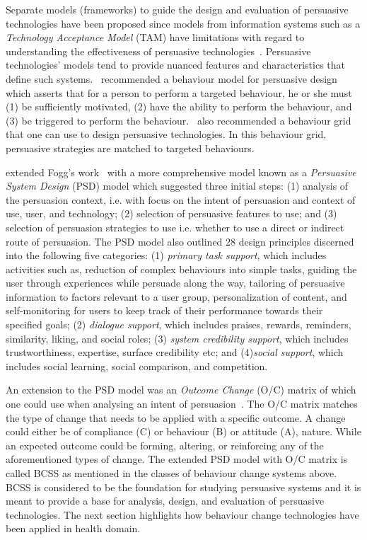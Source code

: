 Separate models (frameworks) to guide the design and evaluation of persuasive technologies have been proposed since models from information systems such as a \emph{Technology Acceptance Model} (TAM) have limitations with regard to understanding the effectiveness of persuasive technologies~\citep{Oinas-kukkonen:psd}. Persuasive technologies' models tend to provide nuanced features and characteristics that define such systems.~\cite{fogg2009behavior} recommended a behaviour model for persuasive design which asserts that for a person to perform a targeted behaviour, he or she must (1) be sufficiently motivated, (2) have the ability to perform the behaviour, and (3) be triggered to perform the behaviour.~\cite{fogg2009behavior2} also recommended a behaviour grid that one can use to design persuasive technologies. In this behaviour grid, persuasive strategies are matched to targeted behaviours. 

\cite{Oinas-kukkonen:psd} extended Fogg's work~\citep{fogg2009behavior} with a more comprehensive model known as a \emph{Persuasive System Design} (PSD) model which suggested three initial steps: (1) analysis of the persuasion context, i.e. with focus on the intent of persuasion and context of use, user, and technology; (2) selection of persuasive features to use; and (3) selection of persuasion strategies to use i.e. whether to use a direct or indirect route of persuasion. The PSD model also outlined 28 design principles discerned into the following five categories: (1) \emph{primary task support}, which includes activities such as, reduction of complex behaviours into simple tasks, guiding the user through experiences while persuade along the way, tailoring of persuasive information to factors relevant to a user group, personalization of content, and self-monitoring for users to keep track of their performance towards their specified goals; (2) \emph{dialogue support}, which includes praises, rewards, reminders, similarity, liking, and social roles; (3) \emph{system credibility support}, which includes trustworthiness, expertise, surface credibility etc; and (4)\emph{social support}, which includes social learning, social comparison, and competition.

An extension to the PSD model was an \emph{Outcome Change} (O/C) matrix of which one could use when analysing an intent of persuasion~\citep{Oinas-Kukkonen:foundation}. The O/C matrix matches the type of change that needs to be applied with a specific outcome. A change could either be of compliance (C) or behaviour (B) or attitude (A), nature. While an expected outcome could be forming, altering, or reinforcing any of the aforementioned types of change. The extended PSD model with O/C matrix is called BCSS as mentioned in the classes of behaviour change systems above. BCSS is considered to be the foundation for studying persuasive systems and it is meant to provide a base for analysis, design, and evaluation of persuasive technologies. The next section highlights how behaviour change technologies have been applied in health domain.

